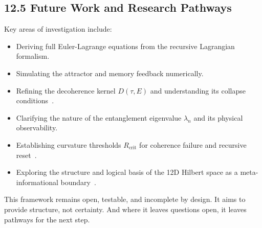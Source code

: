 \subsection*{12.5 Future Work and Research Pathways}

Key areas of investigation include:

\begin{itemize}
  \item Deriving full Euler-Lagrange equations from the recursive Lagrangian formalism.
  \item Simulating the attractor and memory feedback numerically.
  \item Refining the decoherence kernel \( D(\tau, E) \) and understanding its collapse conditions~\cite{grigolini1999coherence}.
  \item Clarifying the nature of the entanglement eigenvalue \( \lambda_n \) and its physical observability.
  \item Establishing curvature thresholds \( R_{\text{crit}} \) for coherence failure and recursive reset~\cite{ashtekar2011loop}.
  \item Exploring the structure and logical basis of the 12D Hilbert space as a meta-informational boundary~\cite{tegmark2008mathematical}.
\end{itemize}

This framework remains open, testable, and incomplete by design. It aims to provide structure, not certainty. And where it leaves questions open, it leaves pathways for the next step.

